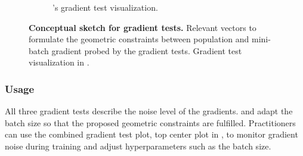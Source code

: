 \begin{figure*}[ht]
\begin{subfigure}[t]{0.39\linewidth}
    \tikzexternaldisable
    \caption{\cockpit's gradient test visualization.}
    \label{cockpit::subfig:gradient-test-sketch2}
  \end{subfigure}
  \caption{\textbf{Conceptual sketch for gradient tests.}
     Relevant vectors to
    formulate the geometric constraints between population and mini-batch
    gradient probed by the gradient tests.
     Gradient test
    visualization in \cockpit.}
  \label{cockpit::fig:gradient-tests-sketch}
\end{figure*}

\subsubsection{Usage}

All three gradient tests describe the noise level of the gradients.
\citet{bollapragada2017adaptive} and \citet{byrd2012sample} adapt the batch size
so that the proposed geometric constraints are fulfilled. Practitioners can use
the combined gradient test plot, \ie top center plot in
, to monitor gradient noise during training and
adjust hyperparameters such as the batch size.


